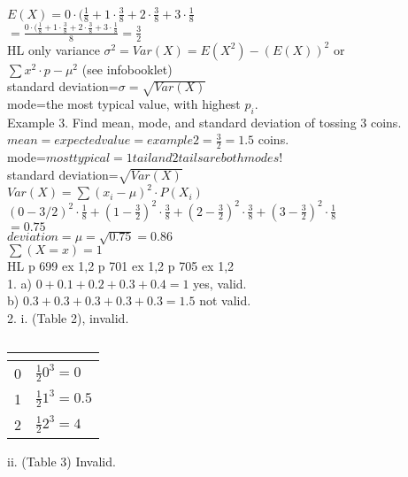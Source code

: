 \documentclass{article}
\begin{document}
  $E(X)=0\cdot (\frac{1}{8}+1\cdot\frac{3}{8}+2\cdot\frac{3}{8}+3\cdot\frac{1}{8}$\\
  $=\frac{0\cdot (\frac{1}{8}+1\cdot\frac{3}{8}+2\cdot\frac{3}{8}+3\cdot\frac{1}{8}}{8}=\frac{3}{2}$\\
  HL only variance $\sigma^2=Var(X)=E(X^2)-(E(X))^2$ or\\
  $\sum x^2\cdot p-\mu ^2$ (see infobooklet)\\
  standard deviation=$\sigma=\sqrt{Var(X)}$\\
  mode=the most typical value, with highest $p_i$.\\
  Example 3. Find mean, mode, and standard deviation of tossing 3 coins.\\
  $mean=expected value=example 2=\frac{3}{2}=1.5$ coins.\\
  mode=$most typical=1 tail and 2 tails are both modes!$\\
  standard deviation=$\sqrt{Var(X)}$\\
  $Var(X)=\sum(x_i-\mu)^2\cdot P(X_i)$\\
  $(0-3/2)^2\cdot\frac{1}{8}+(1-\frac{3}{2})^2\cdot\frac{3}{8}+(2-\frac{3}{2})^2\cdot\frac{3}{8}+(3-\frac{3}{2})^2\cdot\frac{1}{8}$\\
  $=0.75$\\
  $deviation=\mu=\sqrt{0.75}=0.86$\\
  $\sum(X=x)=1$\\
  HL p 699 ex 1,2 p 701 ex 1,2 p 705 ex 1,2\\
  1. a) $0+0.1+0.2+0.3+0.4=1$ yes, valid.\\
  b) $0.3+0.3+0.3+0.3+0.3=1.5$ not valid.\\
  2. i. (Table 2), invalid. \\
  \begin{table}
    \caption{}\label{tab:}
    \begin{center}
      \begin{tabular}[c]{l|l}
        \hline
        \multicolumn{1}{c|}{\textbf{}} & 
        \multicolumn{1}{c}{\textbf{}} \\
        \hline
        0 & $\frac{1}{2}0^3=0$ \\
        1 & $\frac{1}{2}1^3=0.5$ \\
        2 & $\frac{1}{2}2^3=4$\\
        \hline
      \end{tabular}
    \end{center}
  \end{table}
  ii. (Table 3) Invalid.\\
\end{document}

